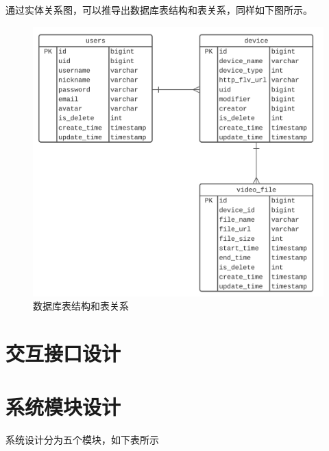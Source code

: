 通过实体关系图，可以推导出数据库表结构和表关系，同样如下图所示。

\begin{figure}[ht]
    \centering
    \includegraphics[scale=.6]{./Figure/IMG_db.png}
    \caption{数据库表结构和表关系}\label{Fig:db}
\end{figure}

\section{交互接口设计}

\section{系统模块设计}
系统设计分为五个模块，如下表所示


